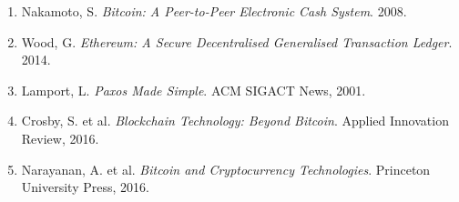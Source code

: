 \documentclass[11pt]{article}
\begin{document}
\begin{enumerate}

\item Nakamoto, S. \textit{Bitcoin: A Peer-to-Peer Electronic Cash System}. 2008.

\item Wood, G. \textit{Ethereum: A Secure Decentralised Generalised Transaction Ledger}. 2014.

\item Lamport, L. \textit{Paxos Made Simple}. ACM SIGACT News, 2001.

\item Crosby, S. et al. \textit{Blockchain Technology: Beyond Bitcoin}. Applied Innovation Review, 2016.

\item Narayanan, A. et al. \textit{Bitcoin and Cryptocurrency Technologies}. Princeton University Press, 2016.

\end{enumerate}
\end{document}
